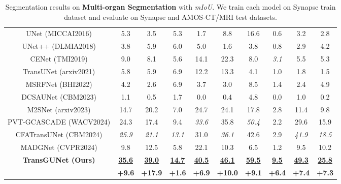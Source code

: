 \begin{table*}[t]
\begin{tabular}{c|c|cccccccc}
    \hline
    UNet \tiny{(MICCAI2016)}     & 5.3 & 3.5 & 5.3 & 1.7 & 8.8 & 16.6 & 0.6 & 3.2 & 2.8 \\
    UNet++ \tiny{(DLMIA2018)}    & 3.8 & 5.9 & 6.0 & 5.0 & 1.6 & 3.8 & 0.8 & 2.9 & 4.2 \\
    CENet \tiny{(TMI2019)}       & 9.0 & 8.1 & 5.6 & 14.1 & 22.3 & 8.0 & \textit{3.1} & 5.5 & 5.3 \\
    TransUNet \tiny{(arxiv2021)} & 5.8 & 5.9 & 6.9 & 12.2 & 13.3 & 4.1 & 1.0 & 1.8 & 1.5 \\
    MSRFNet \tiny{(BHI2022)}     & 4.2 & 2.6 & 6.9 & 3.7 & 3.0 & 8.5 & 1.4 & 2.4 & 4.9 \\
    DCSAUNet \tiny{(CBM2023)}    & 1.1 & 0.5 & 1.7 & 0.0 & 0.4 & 4.8 & 0.0 & 1.0 & 0.2 \\
    M2SNet \tiny{(arxiv2023)}    & 14.7 & 20.2 & 7.0 & 24.7 & 24.1 & 17.8 & 2.8 & 11.4 & 9.8 \\
    PVT-GCASCADE \tiny{(WACV2024)} & 24.3 & 17.4 & 9.4 & \textit{33.6} & 35.8 & \textit{50.4} & 2.2 & 29.6 & 15.9 \\
    CFATransUNet \tiny{(CBM2024)} & \textit{25.9} & \textit{21.1} & \textit{13.1} & 31.0 & \textit{36.1} & 42.6 & 2.9 & \textit{41.9} & \textit{18.5} \\
    MADGNet \tiny{(CVPR2024)}    & 9.8 & 12.5 & 5.8 & 22.1 & 10.3 & 6.5 & 1.2 & 9.5 & 10.2 \\
    \hline
    \multicolumn{1}{c|}{\multirow{2}{*}{\textbf{TransGUNet \tiny{(Ours)}}}} & \textbf{\underline{35.6}} & \textbf{\underline{39.0}} & \textbf{\underline{14.7}} & \textbf{\underline{40.5}} & \textbf{\underline{46.1}} & \textbf{\underline{59.5}} & \textbf{\underline{9.5}} & \textbf{\underline{49.3}} & \textbf{\underline{25.8}} \\ \cline{2-10}
    & \textbf{+9.6} & \textbf{+17.9} & \textbf{+1.6} & \textbf{+6.9} & \textbf{+10.0} & \textbf{+9.1} & \textbf{+6.4} & \textbf{+7.4} & \textbf{+7.3} \\
    \hline
    \end{tabular}
    \caption{Segmentation results on \textbf{Multi-organ Segmentation} with \textit{mIoU}. We train each model on Synapse \cite{Synapse_dataset} train dataset and evaluate on Synapse \cite{Synapse_dataset} and AMOS-CT/MRI \cite{ji2022amos} test datasets.}
    \label{tab:comparison_sota_multiorgan_mIoU_metrics}
\end{table*}

